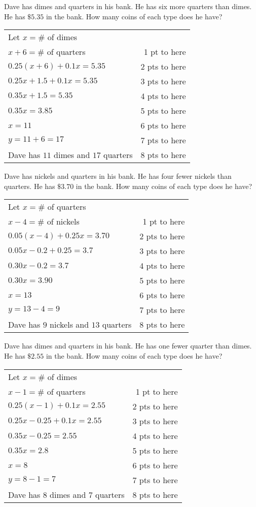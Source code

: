 {
	Dave has dimes and quarters in his bank. He has six more quarters than dimes. He has $\$5.35$ in the bank. How many coins of each type does he have?
}
{
	\begin{tabular}{l r}
	Let $x=\#$ of dimes & \\
	$x+6=\#$ of quarters & 1 pt to here\\
	$0.25(x+6)+0.1x=5.35$ & 2 pts to here\\
	$0.25x +1.5+0.1x=5.35$ & 3 pts to here\\
	$0.35x +1.5 =5.35$ & 4 pts to here\\
	$0.35x=3.85$ & 5 pts to here\\
	$x=11$ & 6 pts to here\\
	$y=11+6=17$ & 7 pts to here\\
	Dave has $11$ dimes and $17$ quarters & 8 pts to here
	\end{tabular}
}

{
	Dave has nickels and quarters in his bank. He has four fewer nickels than quarters. He has $\$3.70$ in the bank. How many coins of each type does he have?
}
{
	\begin{tabular}{l r}
	Let $x=\#$ of quarters & \\
	$x-4=\#$ of nickels & 1 pt to here\\
	$0.05(x-4)+0.25x=3.70$ & 2 pts to here\\
	$0.05x-0.2+0.25=3.7$ & 3 pts to here\\
	$0.30x-0.2=3.7$ & 4 pts to here\\
	$0.30x=3.90$ & 5 pts to here\\
	$x=13$ & 6 pts to here\\
	$y=13-4=9$ & 7 pts to here\\
	Dave has $9$ nickels and $13$ quarters & 8 pts to here
	\end{tabular}
}

{
	Dave has dimes and quarters in his bank. He has one fewer quarter than dimes. He has $\$2.55$ in the bank. How many coins of each type does he have?
}
{
	\begin{tabular}{l r}
	Let $x=\#$ of dimes & \\
	$x-1=\#$ of quarters & 1 pt to here\\
	$0.25(x-1)+0.1x=2.55$ & 2 pts to here\\
	$0.25x-0.25+0.1x=2.55$ & 3 pts to here\\
	$0.35x-0.25 =2.55$ & 4 pts to here\\
	$0.35x=2.8$ & 5 pts to here\\
	$x=8$ & 6 pts to here\\
	$y=8-1=7$ & 7 pts to here\\
	Dave has $8$ dimes and $7$ quarters & 8 pts to here
	\end{tabular}
}

